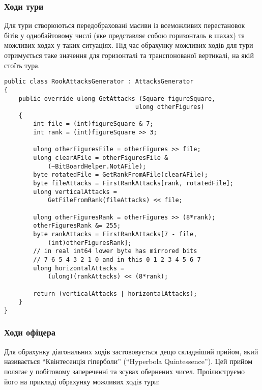 \documentclass[12pt,a4paper]{article}
\begin{document}
\fontsize{14pt}{6mm}\selectfont

\subsubsection{Ходи тури}

Для тури створюються передобраховані масиви із всеможливих перестановок бітів
у однобайтовому числі (яке представляє собою горизонталь в шахах) та можливих
ходах у таких ситуаціях. Під час обрахунку можливих ходів для тури отримується
таке значення для горизонталі та транспонованої вертикалі, на якій стоїть
тура.

\singlespacing
\begin{lstlisting}
public class RookAttacksGenerator : AttacksGenerator
{
    public override ulong GetAttacks (Square figureSquare,
                                    ulong otherFigures)
    {
        int file = (int)figureSquare & 7;
        int rank = (int)figureSquare >> 3;

        ulong otherFiguresFile = otherFigures >> file;
        ulong clearAFile = otherFiguresFile &
            (~BitBoardHelper.NotAFile);
        byte rotatedFile = GetRankFromAFile(clearAFile);
        byte fileAttacks = FirstRankAttacks[rank, rotatedFile];
        ulong verticalAttacks =
            GetFileFromRank(fileAttacks) << file;

        ulong otherFiguresRank = otherFigures >> (8*rank);
        otherFiguresRank &= 255;
        byte rankAttacks = FirstRankAttacks[7 - file,
            (int)otherFiguresRank];
        // in real int64 lower byte has mirrored bits
        // 7 6 5 4 3 2 1 0 and in this 0 1 2 3 4 5 6 7
        ulong horizontalAttacks =
            (ulong)(rankAttacks) << (8*rank);

        return (verticalAttacks | horizontalAttacks);
    }
}
\end{lstlisting}

\fontsize{14pt}{6mm}\selectfont

\subsubsection{Ходи офіцера}

Для обрахунку діагональних ходів застововується дещо складніший прийом, який
називається ``Квінтесенція гіперболи'' (``Hyperbola Quintessence''). Цей
прийом полягає у побітовому запереченні та зсувах обернених
чисел. Проілюструємо його на прикладі обрахунку можливих ходів тури:
\end{document}
